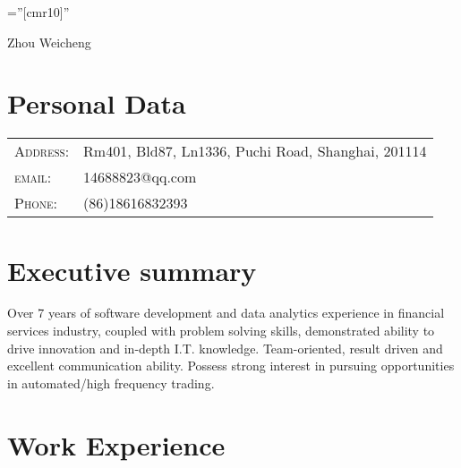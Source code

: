 \documentclass[a4paper,10pt]{article}
\begin{document}

\pagestyle{empty} %

\font\fb=''[cmr10]'' %

\par{\centering
		{\Huge Zhou Weicheng
	}\bigskip\par}



\section{Personal Data}

\begin{tabular}{ll}
    \textsc{Address:}   & Rm401, Bld87, Ln1336, Puchi Road, Shanghai, 201114 \\
        \textsc{email:}    &14688823@qq.com\\
	\textsc{Phone:}     & (86)18616832393\\
\end{tabular}

\section{Executive summary}
{Over 7 years of software development and data analytics experience in financial services industry, coupled with problem solving skills, demonstrated ability to drive innovation and in-depth I.T. knowledge. Team-oriented, result driven and excellent communication ability. Possess strong interest in pursuing opportunities in automated/high frequency trading.}

\section{Work Experience}

\end{document}
